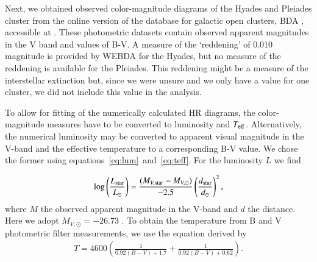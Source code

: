 \documentclass{aa}
\newcommand{\Sun}[0]{\ensuremath{_{\odot}}}
\begin{document}
    Next, we obtained observed color-magnitude diagrams of the Hyades and Pleiades cluster from the online version of the database for galactic open clusters, BDA \citep{1995ASSL..203..127M}, accessible at \citep{webda}. These photometric datasets contain observed apparent magnitudes in the V band and values of B-V. A measure of the `reddening' of 0.010 magnitude is provided by WEBDA for the Hyades, but no measure of the reddening is available for the Pleiades. This reddening might be a measure of the interstellar extinction but, since we were unsure and we only have a value for one cluster, we did not include this value in the analysis. 

    To allow for fitting of the numerically calculated HR diagrams, the color-magnitude measures have to be converted to luminosity and $T_{\rm eff}$. Alternatively, the numerical luminosity may be converted to apparent visual magnitude in the V-band and the effective temperature to a corresponding B-V value. We chose the former using equations~\eqref{eq:lum}~and~\eqref{eq:teff}. For the luminosity $L$ we find


\begin{eqnarray}
    \log \left(\frac{L_{\rm star}}{L\Sun}\right) = \frac{(M_{V,\rm star}-M_{V,\odot})}{-2.5} \left(\frac{d_{\rm star}}{d\Sun}\right)^2 \label{eq:lum},
\end{eqnarray}
where $M$ the observed apparent magnitude in the V-band and $d$ the distance. Here we adopt $M_{V, \odot} = -26.73$ \citep{1957ApJ...126..266S}. To obtain the temperature from B and V photometric filter measurements, we use the equation derived by \citet{2012EL.....9734008B}
\begin{eqnarray}
    T = 4600 \left(\frac{1}{0.92 (B-V) + 1.7} + \frac{1}{0.92(B-V) + 0.62} \right) \label{eq:teff}.
\end{eqnarray}
\end{document}
